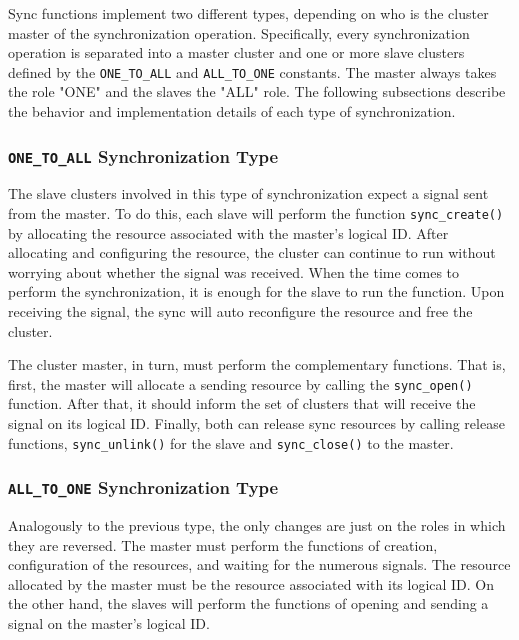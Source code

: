 				Sync functions implement two different types, depending on who is the
				cluster master of the synchronization operation.
				Specifically, every synchronization operation is separated into a
				master cluster and one or more slave clusters defined by the
				\texttt{ONE\_TO\_ALL} and \texttt{ALL\_TO\_ONE} constants.
				The master always takes the role "ONE" and the slaves the "ALL" role.
				The following subsections describe the behavior and implementation
				details of each type of synchronization.

				\subsubsection*{\texttt{ONE\_TO\_ALL} Synchronization Type}

					The slave clusters involved in this type of synchronization expect
					a signal sent from the master.
					To do this, each slave will perform the function \texttt{sync\_create()}
					by allocating the resource associated with the master's logical ID.
					After allocating and configuring the resource, the cluster can
					continue to run without worrying about whether the signal was received.
					When the time comes to perform the synchronization, it is enough for
					the slave to run the function.
					Upon receiving the signal, the sync will auto reconfigure the resource
					and free the cluster.

					The cluster master, in turn, must perform the complementary functions.
					That is, first, the master will allocate a sending resource by calling
					the \texttt{sync\_open()} function.
					After that, it should inform the set of clusters that will receive the
					signal on its logical ID.
					Finally, both can release sync resources by calling release functions,
					\texttt{sync\_unlink()} for the slave and \texttt{sync\_close()} to
					the master.

				\subsubsection*{\texttt{ALL\_TO\_ONE} Synchronization Type}

					Analogously to the previous type, the only changes are just on
					the roles in which they are reversed.
					The master must perform the functions of creation, configuration
					of the resources, and waiting for the numerous signals.
					The resource allocated by the master must be the resource
					associated with its logical ID.
					On the other hand, the slaves will perform the functions of
					opening and sending a signal on the master's logical ID.

